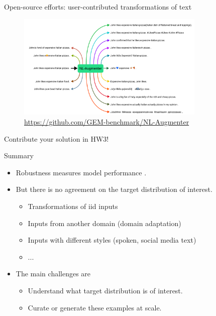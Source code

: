 \documentclass[usenames,dvipsnames,notes,11pt,aspectratio=169,hyperref={colorlinks=true, linkcolor=blue}]{beamer}
\begin{document}
\begin{frame}
    {Open-source efforts: user-contributed transformations of text}
    \begin{figure}
        \includegraphics[width=0.8\textwidth]{figures/nl-augmenter}
        \caption{\url{https://github.com/GEM-benchmark/NL-Augmenter}}
    \end{figure}
    \vspace{-2em}
        Contribute your solution in HW3!
\end{frame}

\begin{frame}
    {Summary}

    \begin{itemize}
        \item Robustness measures model performance .
        \item But there is no agreement on the target distribution of interest.
            \begin{itemize}
                \item Transformations of iid inputs
                \item Inputs from another domain (domain adaptation)
                \item Inputs with different styles (spoken, social media text)
                \item ...
            \end{itemize}
            \pause
        \item The main challenges are
            \begin{itemize}
                \item Understand what target distribution is of interest.
                \item Curate or generate these examples at scale. 
            \end{itemize}
    \end{itemize}
\end{frame}
\end{document}
